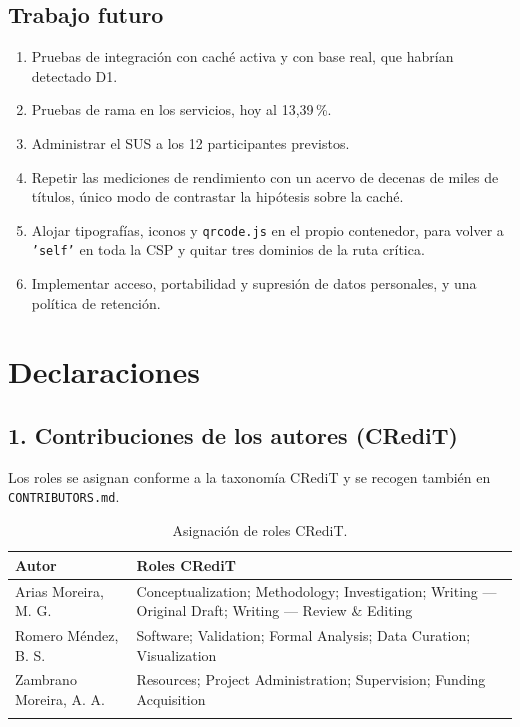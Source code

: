 \documentclass[11pt,a4paper]{article}
\begin{document}
\subsection{Trabajo futuro}

\begin{enumerate}[leftmargin=*]
  \item Pruebas de integración con caché activa y con base real, que habrían
        detectado D1.
  \item Pruebas de rama en los servicios, hoy al 13,39\,\%.
  \item Administrar el SUS a los 12 participantes previstos.
  \item Repetir las mediciones de rendimiento con un acervo de decenas de miles de
        títulos, único modo de contrastar la hipótesis sobre la caché.
  \item Alojar tipografías, iconos y \texttt{qrcode.js} en el propio contenedor,
        para volver a \texttt{'self'} en toda la CSP y quitar tres dominios de la
        ruta crítica.
  \item Implementar acceso, portabilidad y supresión de datos personales, y una
        política de retención.
\end{enumerate}

\section{Declaraciones}\label{sec:declaraciones}

\subsection*{1. Contribuciones de los autores (CRediT)}

Los roles se asignan conforme a la taxonomía CRediT y se recogen también en
\texttt{CONTRIBUTORS.md}.

\begin{longtable}{@{}p{4.6cm}p{10.4cm}@{}}
\toprule
\textbf{Autor} & \textbf{Roles CRediT} \\
\midrule
\endhead
Arias Moreira, M. G. & Conceptualization; Methodology; Investigation; Writing --- Original Draft; Writing --- Review \& Editing \\
Romero Méndez, B. S. & Software; Validation; Formal Analysis; Data Curation; Visualization \\
Zambrano Moreira, A. A. & Resources; Project Administration; Supervision; Funding Acquisition \\
\bottomrule
\caption{Asignación de roles CRediT.}
\label{tab:credit}
\end{longtable}
\end{document}
